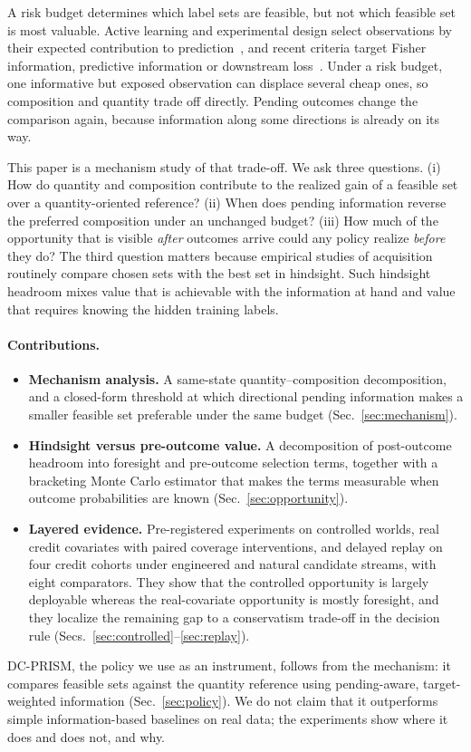\documentclass[runningheads]{llncs}
\begin{document}
A risk budget determines which label sets are feasible, but not which feasible set is most valuable. Active learning and experimental design select observations by their expected contribution to prediction~\cite{cohn1996active,yu2006transductive,settles2009active}, and recent criteria target Fisher information, predictive information or downstream loss~\cite{ash2021fishing,bickfordsmith2023prediction,huang2026loss}. Under a risk budget, one informative but exposed observation can displace several cheap ones, so composition and quantity trade off directly. Pending outcomes change the comparison again, because information along some directions is already on its way.

This paper is a mechanism study of that trade-off. We ask three questions. (i) How do quantity and composition contribute to the realized gain of a feasible set over a quantity-oriented reference? (ii) When does pending information reverse the preferred composition under an unchanged budget? (iii) How much of the opportunity that is visible \emph{after} outcomes arrive could any policy realize \emph{before} they do? The third question matters because empirical studies of acquisition routinely compare chosen sets with the best set in hindsight. Such hindsight headroom mixes value that is achievable with the information at hand and value that requires knowing the hidden training labels.

\paragraph{Contributions.}
\begin{itemize}
\item \textbf{Mechanism analysis.} A same-state quantity--composition decomposition, and a closed-form threshold at which directional pending information makes a smaller feasible set preferable under the same budget (Sec.~\ref{sec:mechanism}).
\item \textbf{Hindsight versus pre-outcome value.} A decomposition of post-outcome headroom into foresight and pre-outcome selection terms, together with a bracketing Monte Carlo estimator that makes the terms measurable when outcome probabilities are known (Sec.~\ref{sec:opportunity}).
\item \textbf{Layered evidence.} Pre-registered experiments on controlled worlds, real credit covariates with paired coverage interventions, and delayed replay on four credit cohorts under engineered and natural candidate streams, with eight comparators. They show that the controlled opportunity is largely deployable whereas the real-covariate opportunity is mostly foresight, and they localize the remaining gap to a conservatism trade-off in the decision rule (Secs.~\ref{sec:controlled}--\ref{sec:replay}).
\end{itemize}
DC-PRISM, the policy we use as an instrument, follows from the mechanism: it compares feasible sets against the quantity reference using pending-aware, target-weighted information (Sec.~\ref{sec:policy}). We do not claim that it outperforms simple information-based baselines on real data; the experiments show where it does and does not, and why.
\end{document}
